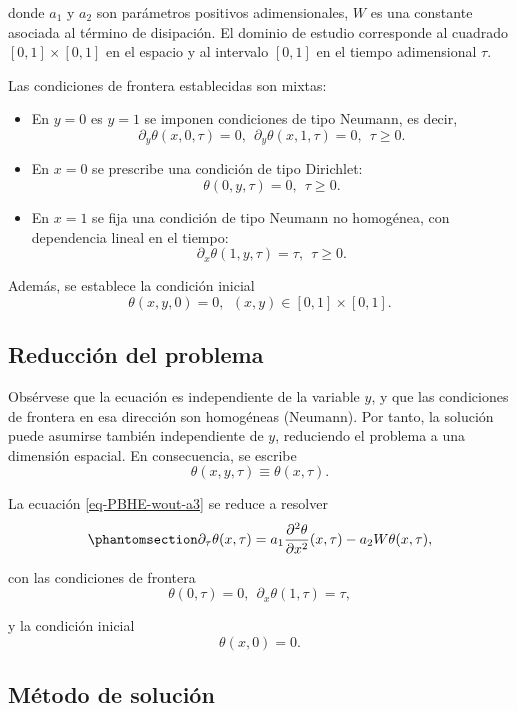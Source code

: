 \documentclass[
  spanish,
  us-letterpaper,
]{scrreprt}
\theoremstyle{definition}
\theoremstyle{plain}
\theoremstyle{remark}
\begin{document}
donde \(a_{1}\) y \(a_{2}\) son parámetros positivos adimensionales,
\(W\) es una constante asociada al término de disipación. El dominio de
estudio corresponde al cuadrado \([0,1]\times[0,1]\) en el espacio y al
intervalo \([0,1]\) en el tiempo adimensional \(\tau\).

Las condiciones de frontera establecidas son mixtas:

\begin{itemize}
\item
  En \(y=0\) es \(y=1\) se imponen condiciones de tipo Neumann, es
  decir, \[
  ∂_y ​θ(x,0,τ)=0, \ \ ∂_y ​θ(x,1,τ)=0, \ \ τ≥0.
  \]
\item
  En \(x=0\) se prescribe una condición de tipo Dirichlet: \[
  θ(0,y,τ)=0, \ \ τ≥0.
  \]
\item
  En \(x=1\) se fija una condición de tipo Neumann no homogénea, con
  dependencia lineal en el tiempo: \[
  ∂_x ​θ(1,y,τ)=τ, \ \ τ≥0.
  \]
\end{itemize}

Además, se establece la condición inicial \[
θ(x,y,0)=0,\ \ (x,y)∈[0,1]×[0,1].
\]

\subsection{Reducción del problema}\label{reducciuxf3n-del-problema}

Obsérvese que la ecuación es independiente de la variable \(y\), y que
las condiciones de frontera en esa dirección son homogéneas (Neumann).
Por tanto, la solución puede asumirse también independiente de \(y\),
reduciendo el problema a una dimensión espacial. En consecuencia, se
escribe \[
θ(x,y,τ) \equiv θ(x,τ).
\]

La ecuación \ref{eq-PBHE-wout-a3} se reduce a resolver
\begin{equation}\phantomsection\label{eq-partial-sol-ana}{
\partial _\tau \theta(x,\tau) = a_1 \dfrac{\partial^2 \theta}{\partial x^2}(x,\tau) - a_2W\theta(x,\tau),
}\end{equation}

con las condiciones de frontera \[
θ(0,τ)=0, \ \ ∂_x​θ(1,τ)=τ,
\]

y la condición inicial \[
\theta(x,0) = 0.
\]

\subsection{Método de solución}\label{muxe9todo-de-soluciuxf3n}
\end{document}
